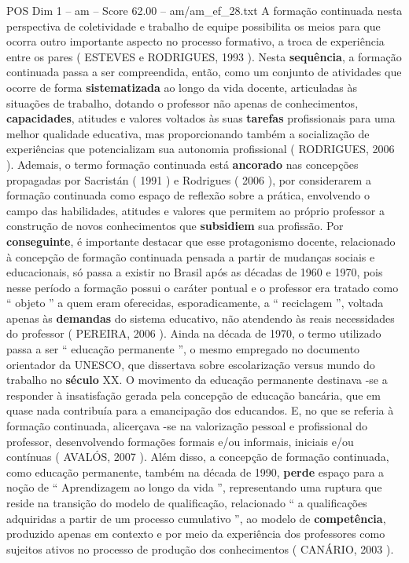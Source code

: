 \begin{textsample}{POS Dim 1 – am – Score 62.00 – am/am\_ef\_28.txt}
A formação continuada nesta perspectiva de coletividade e trabalho de equipe possibilita os meios para que ocorra outro importante aspecto no processo formativo, a troca de experiência entre os pares ( ESTEVES e RODRIGUES, 1993 ).
Nesta \textbf{sequência}, a formação continuada passa a ser compreendida, então, como um conjunto de atividades que ocorre de forma \textbf{sistematizada} ao longo da vida docente, articuladas às situações de trabalho, dotando o professor não apenas de conhecimentos, \textbf{capacidades}, atitudes e valores voltados às suas \textbf{tarefas} profissionais para uma melhor qualidade educativa, mas proporcionando também a socialização de experiências que potencializam sua autonomia profissional ( RODRIGUES, 2006 ).
Ademais, o termo formação continuada está \textbf{ancorado} nas concepções propagadas por Sacristán ( 1991 ) e Rodrigues ( 2006 ), por considerarem a formação continuada como espaço de reflexão sobre a prática, envolvendo o campo das habilidades, atitudes e valores que permitem ao próprio professor a construção de novos conhecimentos que \textbf{subsidiem} sua profissão.
Por \textbf{conseguinte}, é importante destacar que esse protagonismo docente, relacionado à concepção de formação continuada pensada a partir de mudanças sociais e educacionais, só passa a existir no Brasil após as décadas de 1960 e 1970, pois nesse período a formação possui o caráter pontual e o professor era tratado como “ objeto ” a quem eram oferecidas, esporadicamente, a “ reciclagem ”, voltada apenas às \textbf{demandas} do sistema educativo, não atendendo às reais necessidades do professor ( PEREIRA, 2006 ).
Ainda na década de 1970, o termo utilizado passa a ser “ educação permanente ”, o mesmo empregado no documento orientador da UNESCO, que dissertava sobre escolarização versus mundo do trabalho no \textbf{século} XX.
O movimento da educação permanente destinava -se a responder à insatisfação gerada pela concepção de educação bancária, que em quase nada contribuía para a emancipação dos educandos.
E, no que se referia à formação continuada, alicerçava -se na valorização pessoal e profissional do professor, desenvolvendo formações formais e/ou informais, iniciais e/ou contínuas ( AVALÓS, 2007 ).
Além disso, a concepção de formação continuada, como educação permanente, também na década de 1990, \textbf{perde} espaço para a noção de “ Aprendizagem ao longo da vida ”, representando uma ruptura que reside na transição do modelo de qualificação, relacionado “ a qualificações adquiridas a partir de um processo cumulativo ”, ao modelo de \textbf{competência}, produzido apenas em contexto e por meio da experiência dos professores como sujeitos ativos no processo de produção dos conhecimentos ( CANÁRIO, 2003 ).

\end{textsample}
